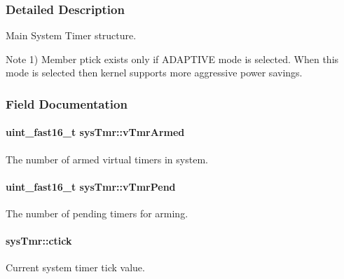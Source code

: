 \subsubsection{Detailed Description}
Main System Timer structure. 

\begin{DoxyNote}{Note}
1) Member {\ttfamily ptick} exists only if A\-D\-A\-P\-T\-I\-V\-E mode is selected. When this mode is selected then kernel supports more aggressive power savings. 
\end{DoxyNote}


\subsubsection{Field Documentation}
\hypertarget{structsysTmr_a3fb347fcb0b2bda6795f5dd8c4413873}{
\paragraph[{v\-Tmr\-Armed}]{\setlength{\rightskip}{0pt plus 5cm}uint\-\_\-fast16\-\_\-t sys\-Tmr\-::v\-Tmr\-Armed}}\label{structsysTmr_a3fb347fcb0b2bda6795f5dd8c4413873}


The number of armed virtual timers in system. 

\hypertarget{structsysTmr_a63badc568f8fde1dd566e1f456aab008}{
\paragraph[{v\-Tmr\-Pend}]{\setlength{\rightskip}{0pt plus 5cm}uint\-\_\-fast16\-\_\-t sys\-Tmr\-::v\-Tmr\-Pend}}\label{structsysTmr_a63badc568f8fde1dd566e1f456aab008}


The number of pending timers for arming. 

\hypertarget{structsysTmr_a1f1fac425438fad41278db9f2865d0a3}{
\paragraph[{ctick}]{ sys\-Tmr\-::ctick}}\label{structsysTmr_a1f1fac425438fad41278db9f2865d0a3}


Current system timer tick value. 

